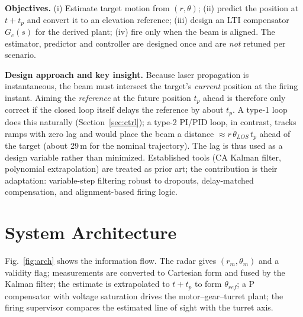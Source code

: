 \documentclass[10pt, conference]{IEEEtran}
\begin{document}
\textbf{Objectives.} (i) Estimate target motion from $(r,\theta)$; (ii) predict the position at $t+t_p$ and convert it to an elevation reference; (iii) design an LTI compensator $G_c(s)$ for the derived plant; (iv) fire only when the beam is aligned. The estimator, predictor and controller are designed once and are \emph{not} retuned per scenario.

\textbf{Design approach and key insight.} Because laser propagation is instantaneous, the beam must intersect the target's \emph{current} position at the firing instant. Aiming the \emph{reference} at the future position $t_p$ ahead is therefore only correct if the closed loop itself delays the reference by about $t_p$. A type-1 loop does this naturally (Section~\ref{sec:ctrl}); a type-2 PI/PID loop, in contrast, tracks ramps with zero lag and would place the beam a distance $\approx r\,\dot\theta_{LOS}\,t_p$ ahead of the target (about 29\,m for the nominal trajectory). The lag is thus used as a design variable rather than minimized. Established tools (CA Kalman filter, polynomial extrapolation) are treated as prior art; the contribution is their adaptation: variable-step filtering robust to dropouts, delay-matched compensation, and alignment-based firing logic.

\section{System Architecture}
Fig.~\ref{fig:arch} shows the information flow. The radar gives $(r_m,\theta_m)$ and a validity flag; measurements are converted to Cartesian form and fused by the Kalman filter; the estimate is extrapolated to $t+t_p$ to form $\theta_{ref}$; a P compensator with voltage saturation drives the motor--gear--turret plant; the firing supervisor compares the estimated line of sight with the turret axis.
\end{document}
